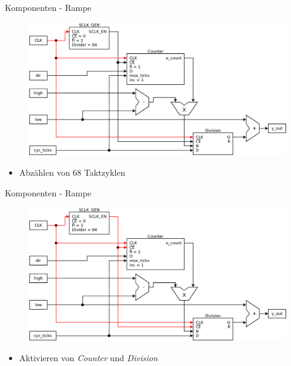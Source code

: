 \documentclass[11pt]{beamer}
\begin{document}
\begin{frame}[t]{Komponenten - Rampe}
  \begin{figure}
    \includegraphics[scale=0.28]{ramp_step0}
  \end{figure}
  \begin{itemize}
    \item  Abzählen von 68 Taktzyklen
  \end{itemize}
\end{frame}

\begin{frame}[t]{Komponenten - Rampe}
  \begin{figure}
    \includegraphics[scale=0.28]{ramp_step1}
  \end{figure}
  \begin{itemize}
    \item Aktivieren von \emph{Counter} und \emph{Division}
  \end{itemize}
\end{frame}
\end{document}
